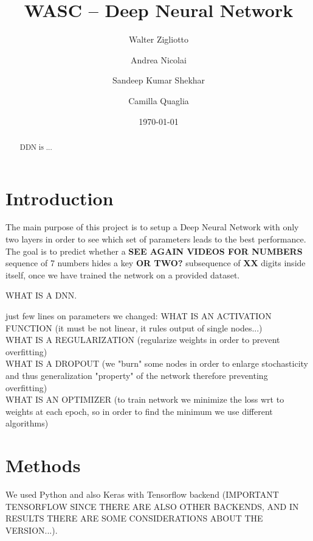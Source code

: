 \documentclass[prl,twocolumn]{revtex4-1}
\begin{document}
\title{WASC -- Deep Neural Network}





\author{Walter Zigliotto}
\author{Andrea Nicolai}
\author{Sandeep Kumar Shekhar}
\author{Camilla Quaglia}

\date{\today}


\begin{abstract}
DDN is ...




\end{abstract}

\maketitle


\section{Introduction}

The main purpose of this project is to setup a Deep Neural Network with only two layers in order to see which set of parameters leads to the best performance. The goal is to predict whether a \textbf{SEE AGAIN VIDEOS FOR NUMBERS} sequence of 7 numbers hides a key \textbf{OR TWO?} subsequence of \textbf{XX} digits inside itself, once we have trained the network on a provided dataset.

\medskip 

WHAT IS A DNN.\\

\medskip

just few lines on parameters we changed:
WHAT IS AN ACTIVATION FUNCTION (it must be not linear, it rules output of single nodes...)\\ 
WHAT IS A REGULARIZATION (regularize weights in order to prevent overfitting)\\
WHAT IS A DROPOUT (we "burn" some nodes in order to enlarge stochasticity and thus generalization "property" of the network therefore preventing overfitting)\\
WHAT IS AN OPTIMIZER (to train network we minimize the loss wrt to weights at each epoch, so in order to find the minimum we use different algorithms)\\


 \section{Methods}
We used Python and also Keras with Tensorflow backend (IMPORTANT TENSORFLOW SINCE THERE ARE ALSO OTHER BACKENDS, AND IN RESULTS THERE ARE SOME CONSIDERATIONS ABOUT THE VERSION...).
 
\end{document}
